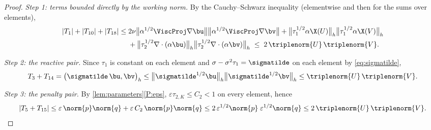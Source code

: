 \begin{proof}
\medskip\noindent\emph{Step 1: terms bounded directly by the working norm.}
By the Cauchy--Schwarz inequality (elementwise and then for the sums over elements),
\begin{align}
  |T_1| + |T_{10}| + |T_{18}|
  \le{}& 2\nu\bigl\lVert\alpha^{1/2}\ViscProj\nabla\bu\bigr\rVert
        \bigl\lVert\alpha^{1/2}\ViscProj\nabla\bv\bigr\rVert
  + \bigl\lVert\tau_1^{1/2}\alpha\X(U)\bigr\rVert_h
        \bigl\lVert\tau_1^{1/2}\alpha\X(V)\bigr\rVert_h \nonumber\\
  &+ \bigl\lVert\tau_2^{1/2}\nabla\cdot(\alpha\bu)\bigr\rVert_h
        \bigl\lVert\tau_2^{1/2}\nabla\cdot(\alpha\bv)\bigr\rVert_h
  \;\le\; 2\,\triplenorm{U}\,\triplenorm{V}.
  \label{eq:easystep}
\end{align}

\medskip\noindent\emph{Step 2: the reactive pair.}
Since $\tau_1$ is constant on each element and
$\sigma-\sigma^2\tau_{1}=\sigmatilde$ on each element by \eqref{eq:sigmatilde},
\begin{equation}\label{eq:reactivestep}
  T_3 + T_{14} = \bigl(\sigmatilde\,\bu,\bv\bigr)_h
  \le \bigl\lVert\sigmatilde^{1/2}\bu\bigr\rVert_h
      \bigl\lVert\sigmatilde^{1/2}\bv\bigr\rVert_h
  \le \triplenorm{U}\,\triplenorm{V}.
\end{equation}

\medskip\noindent\emph{Step 3: the penalty pair.}
By \cref{lem:parameters}\ref{P:eps}, $\varepsilon\tau_{2,K}\le C_2<1$ on every element,
hence
\begin{equation}\label{eq:penaltystep}
  |T_5 + T_{15}|
  \le \varepsilon\,\norm{p}\norm{q} + \varepsilon\,C_2\,\norm{p}\norm{q}
  \le 2\,\varepsilon^{1/2}\norm{p}\;\varepsilon^{1/2}\norm{q}
  \le 2\,\triplenorm{U}\,\triplenorm{V}.
\end{equation}


\end{proof}
